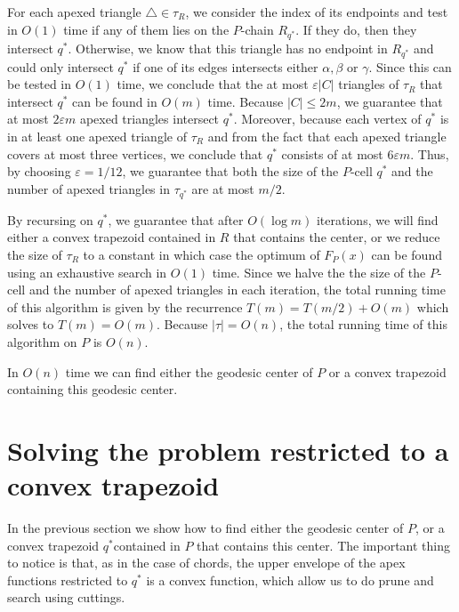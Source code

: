 \documentclass[a4paper,UKenglish]{lipics}
\newcommand{\F}[2]{\ensuremath{F_{\scriptscriptstyle #1}(#2)}}
\begin{document}
For each apexed triangle $\triangle\in \tau_R$, we consider the index of its endpoints and test in $O(1)$ time if any of them lies on the $P$-chain $R_{q^*}$. If they do, then they intersect $q^*$. Otherwise, we know that this triangle has no endpoint in $R_{q^*}$ and could only intersect $q^*$ if one of its edges intersects either $\alpha, \beta$ or $\gamma$. Since this can be tested in $O(1)$ time, we conclude that the at most $\varepsilon |C|$ triangles of $\tau_R$ that intersect $q^*$ can be found in $O(m)$ time.
Because $|C| \leq 2m$, we guarantee that at most $2\varepsilon m$ apexed triangles intersect $q^*$. 
Moreover, because each vertex of $q^*$ is in at least one apexed triangle of $\tau_R$ and from the fact that each apexed triangle covers at most three vertices, we conclude that $q^*$ consists of at most $6 \varepsilon m$.
Thus, by choosing $\varepsilon = 1/12$, we guarantee that both the size of the $P$-cell $q^*$ and the number of apexed triangles in $\tau_{q^*}$ are at most $m/2$.

By recursing on $q^*$, we guarantee that after $O(\log m)$ iterations, we will find either a convex trapezoid contained in $R$ that contains the center, or we reduce the size of $\tau_R$ to a constant in which case the optimum of $\F{P}{x}$ can be found using an exhaustive search in $O(1)$ time. Since we halve the the size of the $P$-cell and the number of apexed triangles in each iteration, the total running time of this algorithm is given by the recurrence $T(m) = T(m/2) + O(m)$ which solves to $T(m) = O(m)$. 
Because $|\tau| = O(n)$, the total running time of this algorithm on $P$ is $O(n)$.

\begin{lemma}\label{lemma:Finding the convex trapezoid}
In $O(n)$ time we can find either the geodesic center of $P$ or a convex trapezoid containing this geodesic center.
\end{lemma}


\section{Solving the problem restricted to a convex trapezoid}
In the previous section we show how to find either the geodesic center of $P$, or a convex trapezoid $q^*$contained in $P$ that contains this center. The important thing to notice is that, as in the case of chords, the upper envelope of the apex functions restricted to $q^*$ is a convex function, which allow us to do prune and search using cuttings.
\end{document}
